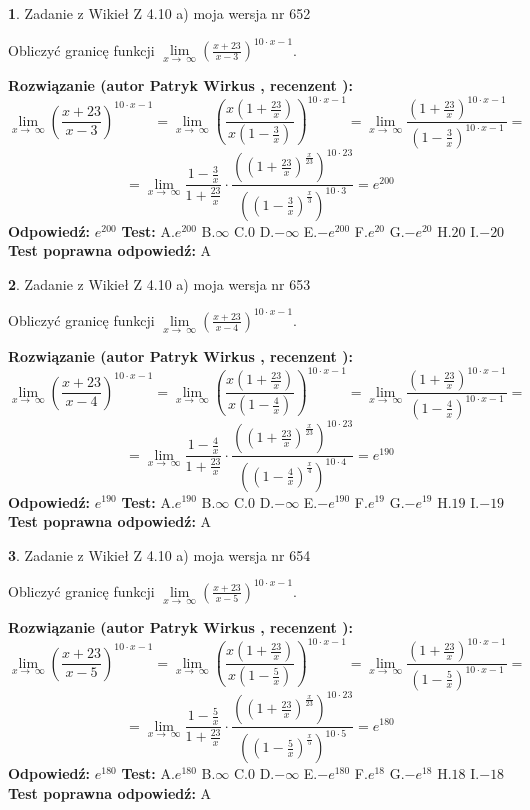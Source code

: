 \documentclass[12pt, a4paper]{article}
\theoremstyle{definition} %
\newtheorem{zad}{}
\newcommand{\zadStart}[1]{\begin{zad}#1\newline}
\newcommand{\zadStop}{\end{zad}}
\newcommand{\rozwStart}[2]{\noindent \textbf{Rozwiązanie (autor #1 , recenzent #2): }\newline}
\newcommand{\rozwStop}{\newline}
\newcommand{\odpStart}{\noindent \textbf{Odpowiedź:}\newline}
\newcommand{\odpStop}{\newline}
\newcommand{\testStart}{\noindent \textbf{Test:}\newline}
\newcommand{\testStop}{\newline}
\newcommand{\kluczStart}{\noindent \textbf{Test poprawna odpowiedź:}\newline}
\newcommand{\kluczStop}{\newline}
\begin{document}
\zadStart{Zadanie z Wikieł Z 4.10 a) moja wersja nr 652}

Obliczyć granicę funkcji  $\lim\limits_{x\to\ \infty}(\frac{x+23}{x-3})^{10\cdot x-1}$.
\zadStop
\rozwStart{Patryk Wirkus}{}
$$\lim\limits_{x\to\ \infty}(\frac{x+23}{x-3})^{10\cdot x-1} = \lim\limits_{x\to\ \infty}(\frac{x(1+\frac{23}{x})}{x(1-\frac{3}{x})})^{10\cdot x-1}=\lim\limits_{x\to\ \infty}\frac{(1+\frac{23}{x})^{10\cdot x-1}}{(1-\frac{3}{x})^{10\cdot x-1}}=$$
$$=\lim\limits_{x\to\ \infty}\frac{1-\frac{3}{x}}{1+\frac{23}{x}}\cdot\frac{((1+\frac{23}{x})^{\frac{x}{23}})^{10\cdot23}}{((1-\frac{3}{x})^{\frac{x}{3}})^{10\cdot3}}=e^{200}$$
\rozwStop
\odpStart
$e^{200}$
\odpStop
\testStart
A.$e^{200}$ B.$\infty$ C.$0$ D.$-\infty$ E.$-e^{200}$
F.$e^{20}$ G.$-e^{20}$
H.$20$
I.$-20$
\testStop
\kluczStart
A
\kluczStop



\zadStart{Zadanie z Wikieł Z 4.10 a) moja wersja nr 653}

Obliczyć granicę funkcji  $\lim\limits_{x\to\ \infty}(\frac{x+23}{x-4})^{10\cdot x-1}$.
\zadStop
\rozwStart{Patryk Wirkus}{}
$$\lim\limits_{x\to\ \infty}(\frac{x+23}{x-4})^{10\cdot x-1} = \lim\limits_{x\to\ \infty}(\frac{x(1+\frac{23}{x})}{x(1-\frac{4}{x})})^{10\cdot x-1}=\lim\limits_{x\to\ \infty}\frac{(1+\frac{23}{x})^{10\cdot x-1}}{(1-\frac{4}{x})^{10\cdot x-1}}=$$
$$=\lim\limits_{x\to\ \infty}\frac{1-\frac{4}{x}}{1+\frac{23}{x}}\cdot\frac{((1+\frac{23}{x})^{\frac{x}{23}})^{10\cdot23}}{((1-\frac{4}{x})^{\frac{x}{4}})^{10\cdot4}}=e^{190}$$
\rozwStop
\odpStart
$e^{190}$
\odpStop
\testStart
A.$e^{190}$ B.$\infty$ C.$0$ D.$-\infty$ E.$-e^{190}$
F.$e^{19}$ G.$-e^{19}$
H.$19$
I.$-19$
\testStop
\kluczStart
A
\kluczStop



\zadStart{Zadanie z Wikieł Z 4.10 a) moja wersja nr 654}

Obliczyć granicę funkcji  $\lim\limits_{x\to\ \infty}(\frac{x+23}{x-5})^{10\cdot x-1}$.
\zadStop
\rozwStart{Patryk Wirkus}{}
$$\lim\limits_{x\to\ \infty}(\frac{x+23}{x-5})^{10\cdot x-1} = \lim\limits_{x\to\ \infty}(\frac{x(1+\frac{23}{x})}{x(1-\frac{5}{x})})^{10\cdot x-1}=\lim\limits_{x\to\ \infty}\frac{(1+\frac{23}{x})^{10\cdot x-1}}{(1-\frac{5}{x})^{10\cdot x-1}}=$$
$$=\lim\limits_{x\to\ \infty}\frac{1-\frac{5}{x}}{1+\frac{23}{x}}\cdot\frac{((1+\frac{23}{x})^{\frac{x}{23}})^{10\cdot23}}{((1-\frac{5}{x})^{\frac{x}{5}})^{10\cdot5}}=e^{180}$$
\rozwStop
\odpStart
$e^{180}$
\odpStop
\testStart
A.$e^{180}$ B.$\infty$ C.$0$ D.$-\infty$ E.$-e^{180}$
F.$e^{18}$ G.$-e^{18}$
H.$18$
I.$-18$
\testStop
\kluczStart
A
\kluczStop
\end{document}
